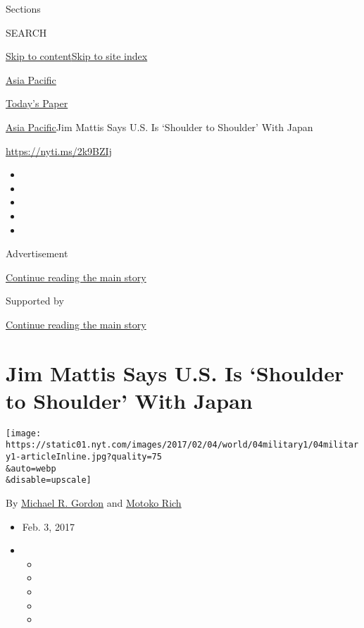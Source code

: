 Sections

SEARCH

\protect\hyperlink{site-content}{Skip to
content}\protect\hyperlink{site-index}{Skip to site index}

\href{https://www.nytimes.com/section/world/asia}{Asia Pacific}

\href{https://myaccount.nytimes.com/auth/login?response_type=cookie\&client_id=vi}{}

\href{https://www.nytimes.com/section/todayspaper}{Today's Paper}

\href{/section/world/asia}{Asia Pacific}\textbar{}Jim Mattis Says U.S.
Is `Shoulder to Shoulder' With Japan

\url{https://nyti.ms/2k9BZIj}

\begin{itemize}
\item
\item
\item
\item
\item
\end{itemize}

Advertisement

\protect\hyperlink{after-top}{Continue reading the main story}

Supported by

\protect\hyperlink{after-sponsor}{Continue reading the main story}

\hypertarget{jim-mattis-says-us-is-shoulder-to-shoulder-with-japan}{%
\section{Jim Mattis Says U.S. Is `Shoulder to Shoulder' With
Japan}\label{jim-mattis-says-us-is-shoulder-to-shoulder-with-japan}}

\texttt{[image: https://static01.nyt.com/images/2017/02/04/world/04military1/04military1-articleInline.jpg?quality=75\\\&auto=webp\\\&disable=upscale]}

By \href{http://www.nytimes.com/by/michael-r-gordon}{Michael R. Gordon}
and \href{http://www.nytimes.com/by/motoko-rich}{Motoko Rich}

\begin{itemize}
\item
  Feb. 3, 2017
\item
  \begin{itemize}
  \item
  \item
  \item
  \item
  \item
  \end{itemize}
\end{itemize}

